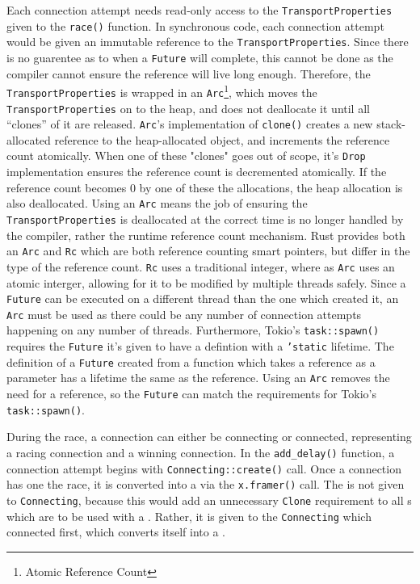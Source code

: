 Each connection attempt needs read-only access to the \texttt{TransportProperties} given to the \texttt{race()}
function.
In synchronous code, each connection attempt would be given an immutable reference to the \texttt{TransportProperties}.
Since there is no guarentee as to when a \texttt{Future} will complete, this cannot be done as the compiler cannot
ensure the reference will live long enough.
Therefore, the \texttt{TransportProperties} is wrapped in an \texttt{Arc}\footnote{Atomic Reference Count}, which moves
the \texttt{TransportProperties} on to the heap, and does not deallocate it until all “clones” of it are released.
\texttt{Arc}'s implementation of \texttt{clone()} creates a new stack-allocated reference to the heap-allocated object,
and increments the reference count atomically.
When one of these "clones" goes out of scope, it's \texttt{Drop} implementation ensures the reference count is
decremented atomically.
If the reference count becomes \(0\) by one of these the allocations, the heap allocation is also deallocated.
Using an \texttt{Arc} means the job of ensuring the \texttt{TransportProperties} is deallocated at the correct time is
no longer handled by the compiler, rather the runtime reference count mechanism.
Rust provides both an \texttt{Arc} and \texttt{Rc} which are both reference counting smart pointers, but differ in the
type of the reference count.
\texttt{Rc} uses a traditional integer, where as \texttt{Arc} uses an atomic interger, allowing for it to be modified
by multiple threads safely.
Since a \texttt{Future} can be executed on a different thread than the one which created it, an \texttt{Arc} must be
used as there could be any number of connection attempts happening on any number of threads.
Furthermore, Tokio's \texttt{task::spawn()} requires the \texttt{Future} it's given to have a defintion with a
\texttt{'static} lifetime.
The definition of a \texttt{Future} created from a function which takes a reference as a parameter has a lifetime the
same as the reference.
Using an \texttt{Arc} removes the need for a reference, so the \texttt{Future} can match the requirements for Tokio's
\texttt{task::spawn()}.

During the race, a connection can either be connecting or connected, representing a racing connection and a winning
connection.
In the \texttt{add\_delay()} function, a connection attempt begins with \texttt{Connecting::create()} call.
Once a connection has one the race, it is converted into a \connection{} via the \texttt{x.framer()} call.
The \framer{} is not given to \texttt{Connecting}, because this would add an unnecessary \texttt{Clone} requirement to
all \framer{}s which are to be used with a \connection{}.
Rather, it is given to the \texttt{Connecting} which connected first, which converts itself into a \connection{}.

